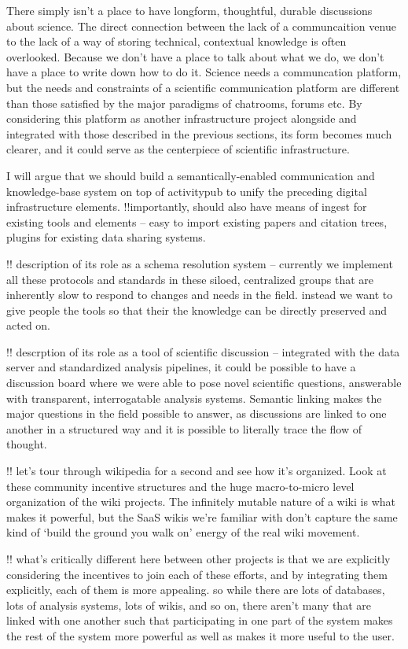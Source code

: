 \documentclass[11pt]{article}
\begin{document}
\begin{multicols}{2}
There simply isn't a place to have longform, thoughtful, durable
discussions about science. The direct connection between the lack of a
communcaition venue to the lack of a way of storing technical,
contextual knowledge is often overlooked. Because we don't have a place
to talk about what we do, we don't have a place to write down how to do
it. Science needs a communcation platform, but the needs and constraints
of a scientific communication platform are different than those
satisfied by the major paradigms of chatrooms, forums etc. By
considering this platform as another infrastructure project alongside
and integrated with those described in the previous sections, its form
becomes much clearer, and it could serve as the centerpiece of
scientific infrastructure.

I will argue that we should build a semantically-enabled communication
and knowledge-base system on top of activitypub to unify the preceding
digital infrastructure elements. !!importantly, should also have means
of ingest for existing tools and elements -- easy to import existing
papers and citation trees, plugins for existing data sharing systems.

!! description of its role as a schema resolution system -- currently we
implement all these protocols and standards in these siloed, centralized
groups that are inherently slow to respond to changes and needs in the
field. instead we want to give people the tools so that their the
knowledge can be directly preserved and acted on.

!! descrption of its role as a tool of scientific discussion --
integrated with the data server and standardized analysis pipelines, it
could be possible to have a discussion board where we were able to pose
novel scientific questions, answerable with transparent, interrogatable
analysis systems. Semantic linking makes the major questions in the
field possible to answer, as discussions are linked to one another in a
structured way and it is possible to literally trace the flow of
thought.

!! let's tour through wikipedia for a second and see how it's organized.
Look at these community incentive structures and the huge macro-to-micro
level organization of the wiki projects. The infinitely mutable nature
of a wiki is what makes it powerful, but the SaaS wikis we're familiar
with don't capture the same kind of `build the ground you walk on'
energy of the real wiki movement.

!! what's critically different here between other projects is that we
are explicitly considering the incentives to join each of these efforts,
and by integrating them explicitly, each of them is more appealing. so
while there are lots of databases, lots of analysis systems, lots of
wikis, and so on, there aren't many that are linked with one another
such that participating in one part of the system makes the rest of the
system more powerful as well as makes it more useful to the user.


\end{multicols}
\end{document}
